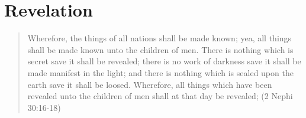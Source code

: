 \section{Revelation}

\begin{quotation}
Wherefore, the things of all nations shall be made known; yea, all things shall be made known unto the children of men. There is nothing which is secret save it shall be revealed; there is no work of darkness save it shall be made manifest in the light; and there is nothing which is sealed upon the earth save it shall be loosed. Wherefore, all things which have been revealed unto the children of men shall at that day be revealed; (2 Nephi 30:16-18)
\end{quotation}
